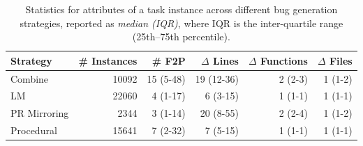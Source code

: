 \begin{table}[h]
    \centering
    \begin{tabular}{l|rrrrr}
\toprule
Strategy & \# Instances & \# F2P & $\Delta$ Lines & $\Delta$ Functions & $\Delta$ Files \\
\midrule
Combine      & 10092 & 15 (5-48) & 19 (12-36) & 2 (2-3) & 1 (1-2) \\
LM           & 22060 & 4 (1-17) & 6 (3-15) & 1 (1-1) & 1 (1-1) \\
PR Mirroring & 2344 & 3 (1-14) & 20 (8-55) & 2 (2-4) & 1 (1-2) \\
Procedural   & 15641 & 7 (2-32) & 7 (5-15) & 1 (1-1) & 1 (1-1) \\
\bottomrule
    \end{tabular}
    \caption{Statistics for attributes of a \bugs{} task instance across different bug generation strategies, reported as \textit{median (IQR)}, where IQR is the inter-quartile range (25th–75th percentile).
    }
    \label{tab:per_bug_type_stats}
\end{table}